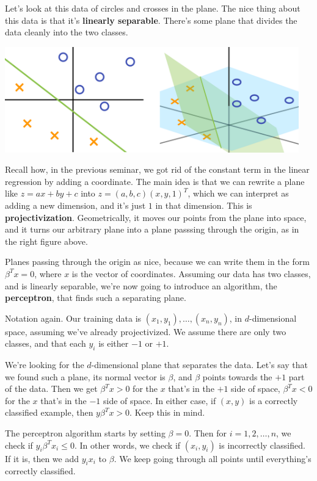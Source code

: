 \documentclass[11pt,paper=letter]{scrartcl}
\begin{document}
Let's look at this data of circles and crosses in the plane. The nice thing about this data is that it's \textbf{linearly separable}. There's some plane that divides the data cleanly into the two classes.
\begin{center}
  \includegraphics[height=1.8in]{11.png}
\end{center}
Recall how, in the previous seminar, we got rid of the constant term in the linear regression by adding a coordinate. The main idea is that we can rewrite a plane like $z = ax + by + c$ into $z = (a, b, c)(x, y, 1)^T$, which we can interpret as adding a new dimension, and it's just $1$ in that dimension. This is \textbf{projectivization}. Geometrically, it moves our points from the plane into space, and it turns our arbitrary plane into a plane passsing through the origin, as in the right figure above.

Planes passing through the origin as nice, because we can write them in the form $\beta^Tx = 0$, where $x$ is the vector of coordinates. Assuming our data has two classes, and is linearly separable, we're now going to introduce an algorithm, the \textbf{perceptron}, that finds such a separating plane.

Notation again. Our training data is $(x_1, y_1), \ldots, (x_n, y_n)$, in $d$-dimensional space, assuming we've already projectivized. We assume there are only two classes, and that each $y_i$ is either $-1$ or $+1$.

We're looking for the $d$-dimensional plane that separates the data. Let's say that we found such a plane, its normal vector is $\beta$, and $\beta$ points towards the $+1$ part of the data. Then we get $\beta^Tx > 0$ for the $x$ that's in the $+1$ side of space, $\beta^Tx < 0$ for the $x$ that's in the $-1$ side of space. In either case, if $(x, y)$ is a correctly classified example, then $y\beta^Tx > 0$. Keep this in mind.

The perceptron algorithm starts by setting $\beta = 0$. Then for $i = 1, 2, \ldots, n$, we check if $y_i\beta^Tx_i \le 0$. In other words, we check if $(x_i, y_i)$ is incorrectly classified. If it is, then we add $y_ix_i$ to $\beta$. We keep going through all points until everything's correctly classified.
\end{document}
